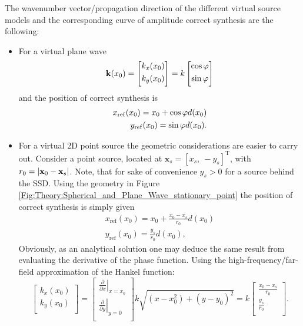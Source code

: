 The wavenumber vector/propagation direction of the different virtual source models and the corresponding curve of amplitude correct synthesis are the following:
\begin{itemize}
\item For a virtual plane wave 
\begin{equation}
\mathbf{k}(x_0) = \begin{bmatrix} k_x(x_0) \\[0.3em] k_y(x_0)\\[0.3em]    \end{bmatrix} =  k\begin{bmatrix} \cos\varphi \\[0.3em] \sin\varphi \\[0.3em]    \end{bmatrix}
\end{equation}
and the position of correct synthesis is 
\begin{eqnarray}
x_{\mathrm{ref}}(x_0) = x_0 + \cos\varphi d(x_0) \\
y_{\mathrm{ref}}(x_0) = \sin\varphi d(x_0).
\end{eqnarray}
\item For a virtual 2D point source the geometric considerations are easier to carry out. Consider a point source, located at $\mathbf{x}_s = [ x_s,\ -y_s ]^{\mathrm{T}}$, with $r_0 = | \mathbf{x}_0 - \mathbf{x}_s |$. Note, that for sake of convenience $y_s>0$ for a source behind the SSD. Using the geometry in Figure \ref{Fig:Theory:Spherical_and_Plane_Wave_stationary_point} the position of correct synthesis is simply given 
\begin{eqnarray}
x_{\mathrm{ref}}(x_0) = x_0 + \frac{x_0-x_s}{r_0} d(x_0) \\
y_{\mathrm{ref}}(x_0) = \frac{y_s}{r_0} d(x_0),
\label{Eq:Line_source_correcty_synth}
\end{eqnarray}
Obviously, as an analytical solution one may deduce the same result from evaluating the derivative of the phase function. Using the high-frequency/far-field approximation of the Hankel function:
\begin{equation} 
\begin{bmatrix} k_x(x_0) \\[0.3em] k_y(x_0)\\[0.3em]    \end{bmatrix} = 
\begin{bmatrix} 
\left. \frac{\partial}{\partial x} \right|_{x = x_0} 
\\[0.3em] 
\left. \frac{\partial}{\partial y} \right|_{y = 0} 
\\[0.3em]    \end{bmatrix} 
k\sqrt{(x-x_0^2) + (y-y_0)^2} = 
k \begin{bmatrix} 
\frac{x_0- x_s}{r_0}
\\[0.3em] 
\frac{y_s}{r_0}
\\[0.3em]    \end{bmatrix} 
.
\end{equation}
\end{itemize}

